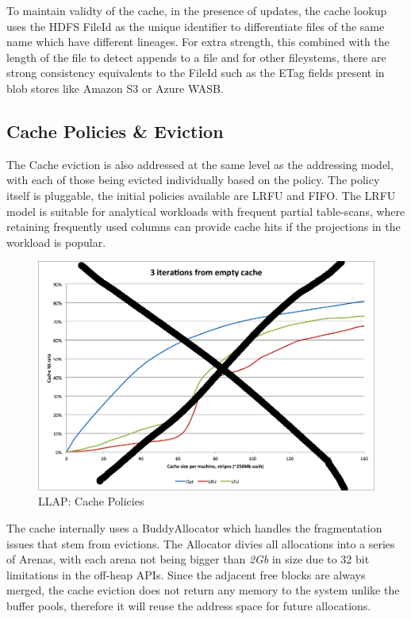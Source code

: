 To maintain validty of the cache, in the presence of updates, the cache lookup uses the HDFS FileId as the unique identifier to 
differentiate files of the same name which have different lineages. For extra strength, this combined with the length of the file
to detect appends to a file and for other fileystems, there are strong consistency equivalents to the FileId such as the ETag 
fields present in blob stores like Amazon S3\cite{S3} or Azure WASB\cite{WASB}. 

\subsection{Cache Policies \& Eviction}

The Cache eviction is also addressed at the same level as the addressing model, with each of those being evicted individually based
on the policy. The policy itself is pluggable, the initial policies available are LRFU and FIFO. The LRFU model is suitable for analytical
workloads with frequent partial table-scans, where retaining frequently used columns can provide cache hits if the projections in the
workload is popular.

\begin{figure}[ht]
\centering
\includegraphics[width=0.8\columnwidth]{figures/evictions.png}
\caption{LLAP: Cache Policies}
\label{fig:eviction}
\end{figure} 

The cache internally uses a BuddyAllocator which handles the fragmentation issues that stem from evictions. The Allocator divies all
allocations into a series of Arenas, with each arena not being bigger than \emph{2Gb} in size due to 32 bit limitations in 
the off-heap APIs. Since the adjacent free blocks are always merged, the cache eviction does not return any memory to the system unlike
the buffer pools, therefore it will reuse the address space for future allocations. 

